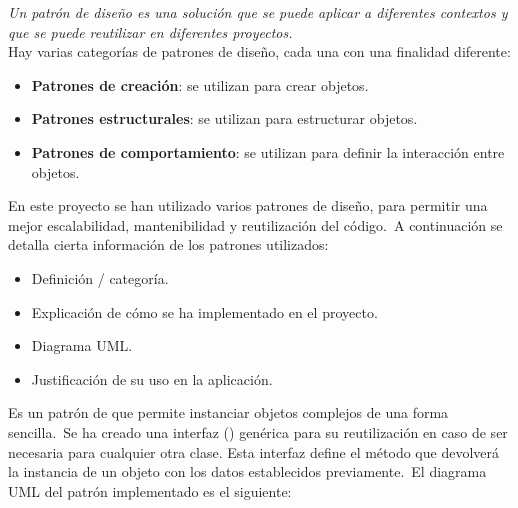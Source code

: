 
\textit{Un patrón de diseño es una solución que se puede aplicar a diferentes contextos y que se
puede reutilizar en diferentes proyectos.} \\
Hay varias categorías de patrones de diseño, cada una con una finalidad diferente:
\begin{itemize}
	\item \textbf{Patrones de creación}: se utilizan para crear objetos.
	\item \textbf{Patrones estructurales}: se utilizan para estructurar objetos.
	\item \textbf{Patrones de comportamiento}: se utilizan para definir la interacción entre objetos.
\end{itemize}
\label{itm:categorías-patrones}

En este proyecto se han utilizado varios patrones de diseño, para permitir una mejor escalabilidad, mantenibilidad y
reutilización del código.\ A continuación se detalla cierta información de los patrones utilizados:
\begin{itemize}
	\item Definición / categoría.
	\item Explicación de cómo se ha implementado en el proyecto.
	\item Diagrama UML\@.
	\item Justificación de su uso en la aplicación.
\end{itemize}
\label{itm:uso-patrones}

Es un patrón de  que permite instanciar objetos complejos de una forma sencilla.\ Se ha creado una
interfaz () genérica para su reutilización en caso de ser necesaria para cualquier otra clase.
Esta interfaz define el método  que devolverá la instancia de un objeto con los datos establecidos
previamente.\ El diagrama UML del patrón implementado es el siguiente:


